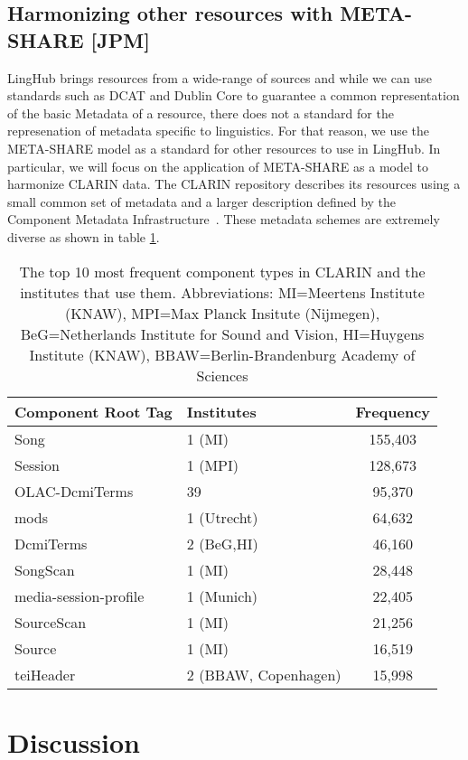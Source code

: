 \documentclass{llncs}
\begin{document}
{\subsection{Harmonizing other resources with META-SHARE [JPM]}
\label{sec:harmonization}
LingHub brings resources from a wide-range of sources and while we can use
standards such as DCAT and Dublin Core to guarantee a common representation of the basic
Metadata of a resource, there does not a standard for the represenation of
metadata specific to linguistics. For that reason, we use the META-SHARE model
as a standard for other resources to use in LingHub. In particular, we will
focus on the application of META-SHARE as a model to harmonize CLARIN data. The
CLARIN repository describes its resources using a small common set of metadata
and a larger description defined by the Component Metadata
Infrastructure~\cite[CMDI]{broeder2012cmdi}. These metadata schemes are
extremely diverse as shown in table \ref{tab:clarin-types}.
\begin{table}
\begin{center}
\begin{tabular}{l|lc}
Component Root Tag & Institutes & Frequency \\
\hline
Song & 1 (MI) & 155,403 \\
Session & 1 (MPI) & 128,673 \\
OLAC-DcmiTerms & 39 & 95,370 \\
mods & 1 (Utrecht)& 64,632 \\
DcmiTerms & 2 (BeG,HI) & 46,160 \\
SongScan & 1 (MI) & 28,448 \\
media-session-profile & 1 (Munich) & 22,405 \\
SourceScan & 1 (MI) & 21,256 \\
Source & 1 (MI) & 16,519 \\
teiHeader & 2 (BBAW, Copenhagen) & 15,998 \\
\end{tabular}
\end{center}
\caption{\label{tab:clarin-types}The top 10 most frequent component types in
CLARIN and the institutes that use them. Abbreviations: MI=Meertens Institute (KNAW),
MPI=Max Planck Insitute (Nijmegen), BeG=Netherlands Institute for Sound and Vision,
HI=Huygens Institute (KNAW), BBAW=Berlin-Brandenburg Academy of Sciences}
\end{table}
\section{Discussion}
\label{sec:discussion}
}
\end{document}
